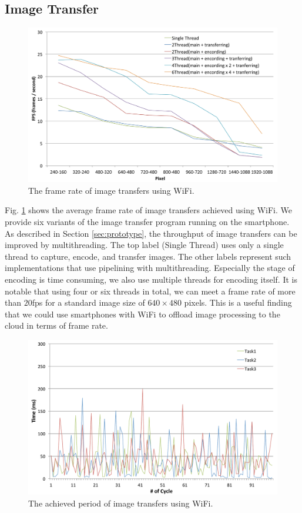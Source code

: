 \subsection{Image Transfer}

\begin{figure}[!t]
 \centering
 \includegraphics[width=0.8\hsize]{fig/No8_TIPiC_FPS_graph_WiFi.pdf}
 \caption{The frame rate of image transfers using WiFi.}
 \label{fig:no8}
\end{figure}

Fig. \ref{fig:no8} shows the average frame rate of image transfers
achieved using WiFi.
We provide six variants of the image transfer program running on the
smartphone.
As described in Section \ref{sec:prototype}, the throughput of image
transfers can be improved by multithreading.
The top label (Single Thread) uses only a single thread to capture,
encode, and transfer images.
The other labels represent such implementations that use pipelining with
multithreading.
Especially the stage of encoding is time consuming, we also use multiple
threads for encoding itself.
It is notable that using four or six threads in total, we can meet a
frame rate of more than $20$fps for a standard image size of $640 \times
480$ pixels.
This is a useful finding that we could use smartphones with WiFi to
offload image processing to the cloud in terms of frame rate.

\begin{figure}[!t]
 \centering
 \includegraphics[width=0.8\hsize]{fig/No9_TIPiC_serv_cycle_WiFi.pdf}
 \caption{The achieved period of image transfers using WiFi.}
 \label{fig:no9}
\end{figure}

